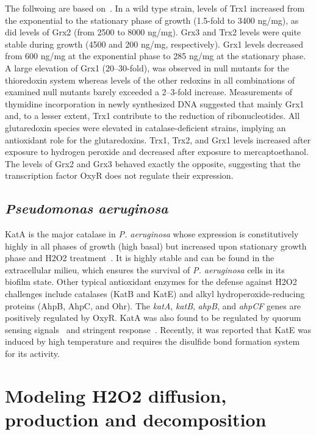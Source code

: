\documentclass[10pt]{article}
\begin{document}
The follwoing are based on~\cite{potamitou2002protein}. In a wild type strain, levels of Trx1 increased from the exponential to the stationary phase of growth (1.5-fold to 3400 ng/mg), as did levels of Grx2 (from 2500 to 8000 ng/mg). Grx3 and Trx2 levels were quite stable during growth (4500 and 200 ng/mg, respectively). Grx1 levels decreased from 600 ng/mg at the exponential phase to 285 ng/mg at the stationary phase. A large elevation of Grx1 (20–30-fold), was observed in null mutants for the thioredoxin system whereas levels of the other redoxins in all combinations of examined null mutants barely exceeded a 2–3-fold increase. Measurements of thymidine incorporation in newly synthesized DNA suggested that mainly Grx1 and, to a lesser extent, Trx1 contribute to the reduction of ribonucleotides. All glutaredoxin species were elevated in catalase-deficient strains, implying an antioxidant role for the glutaredoxins. Trx1, Trx2, and Grx1 levels increased after exposure to hydrogen peroxide and decreased after exposure to mercaptoethanol. The levels of Grx2 and Grx3 behaved exactly the opposite, suggesting that the transcription factor OxyR does not regulate their expression.

\subsection{\textit{Pseudomonas aeruginosa}}

KatA is the major catalase in \textit{P. aeruginosa} whose expression is constitutively highly in all phases of growth (high basal) but increased upon stationary growth phase and H2O2 treatment~\cite{heo2010major}. It is highly stable and can be found in the extracellular milieu, which ensures the survival of \textit{P. aeruginosa} cells in its biofilm state. Other typical antioxidant enzymes for the defense against H2O2 challenges include catalases (KatB and KatE) and alkyl hydroperoxide-reducing proteins (AhpB, AhpC, and Ohr). The \textit{katA}, \textit{katB}, \textit{ahpB}, and \textit{ahpCF} genes are positively regulated by OxyR. KatA was also found to be regulated by quorum sensing signals~\cite{hassett1999quorum} and stringent response~\cite{khakimova2013stringent}. Recently, it was reported that KatE was induced by high temperature and requires the disulfide bond formation system for its activity.

\clearpage
\section{Modeling H2O2 diffusion, production and decomposition}
\end{document}
